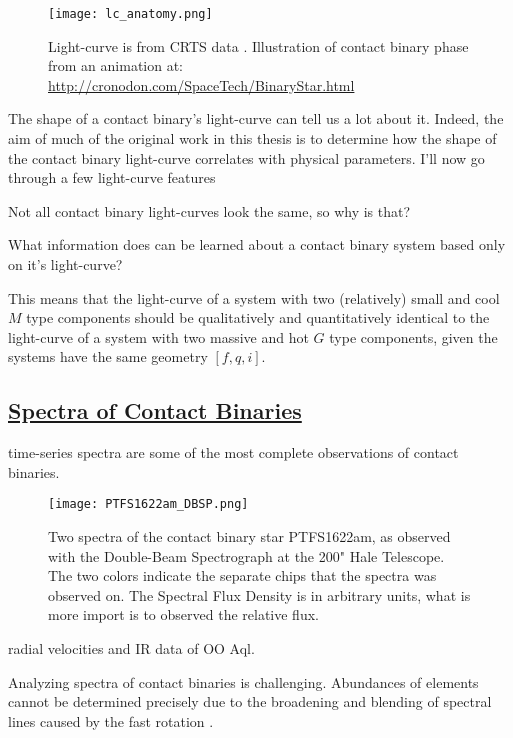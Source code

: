 \documentclass[12pt]{article} %
\numberwithin{equation}{section} %
\begin{document}
\begin{figure}[H]
\centering
\texttt{[image: lc\_anatomy.png]}
\caption{Light-curve is from CRTS data \citep{drake2014catalina}. Illustration of contact binary phase from an animation at: \url{http://cronodon.com/SpaceTech/BinaryStar.html}}
\label{fig: lc_anatomy}
\end{figure}

The shape of a contact binary's light-curve can tell us a lot about it. Indeed, the aim of much of the original work in this thesis is to determine how the shape of the contact binary light-curve correlates with physical parameters. I'll now go through a few light-curve features 

Not all contact binary light-curves look the same, so why is that?

What information does can be learned about a contact binary system based only on it's light-curve?

This means that the light-curve of a system with two (relatively) small and cool $M$ type components should be qualitatively and quantitatively identical to the light-curve of a system with two massive and hot $G$ type components, given the systems have the same geometry $[f,q,i]$.

\subsection[Spectra of Contact Binaries]{\hyperlink{toc}{Spectra of Contact Binaries}} \label{sec: Spectra of Contact Binaries}

time-series spectra are some of the most complete observations of contact binaries. 

\begin{figure}[H]
\centering
\texttt{[image: PTFS1622am\_DBSP.png]}
\caption{Two spectra of the contact binary star PTFS1622am, as observed with the Double-Beam Spectrograph at the 200" Hale Telescope. The two colors indicate the separate chips that the spectra was observed on. The Spectral Flux Density is in arbitrary units, what is more import is to observed the relative flux.}
\label{fig: PTFS1622am_DBSP}
\end{figure}

\citep{hrivnak1989radial} radial velocities and IR data of OO Aql.

Analyzing spectra of contact binaries is challenging. Abundances of elements cannot be determined precisely due to the broadening and blending of spectral lines caused by the fast rotation \citep{gazeas2006masses}. 
\end{document}
